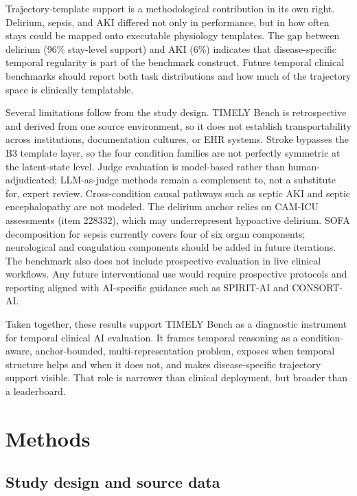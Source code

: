 \documentclass[pdflatex,sn-nature]{sn-jnl}
\begin{document}
Trajectory-template support is a methodological contribution in its own right. Delirium, sepsis, and AKI differed not only in performance, but in how often stays could be mapped onto executable physiology templates. The gap between delirium (96\% stay-level support) and AKI (6\%) indicates that disease-specific temporal regularity is part of the benchmark construct. Future temporal clinical benchmarks should report both task distributions and how much of the trajectory space is clinically templatable.

Several limitations follow from the study design. TIMELY Bench is retrospective and derived from one source environment, so it does not establish transportability across institutions, documentation cultures, or EHR systems. Stroke bypasses the B3 template layer, so the four condition families are not perfectly symmetric at the latent-state level. Judge evaluation is model-based rather than human-adjudicated; LLM-as-judge methods remain a complement to, not a substitute for, expert review\cite{zheng2023judging,bedi2025medhelm}. Cross-condition causal pathways such as septic AKI and septic encephalopathy are not modeled. The delirium anchor relies on CAM-ICU assessments (item 228332), which may underrepresent hypoactive delirium. SOFA decomposition for sepsis currently covers four of six organ components; neurological and coagulation components should be added in future iterations. The benchmark also does not include prospective evaluation in live clinical workflows. Any future interventional use would require prospective protocols and reporting aligned with AI-specific guidance such as SPIRIT-AI and CONSORT-AI\cite{rivera2020spiritai,liu2020consortai}.

Taken together, these results support TIMELY Bench as a diagnostic instrument for temporal clinical AI evaluation. It frames temporal reasoning as a condition-aware, anchor-bounded, multi-representation problem, exposes when temporal structure helps and when it does not, and makes disease-specific trajectory support visible. That role is narrower than clinical deployment, but broader than a leaderboard.

\section{Methods}

\subsection{Study design and source data}
\end{document}
